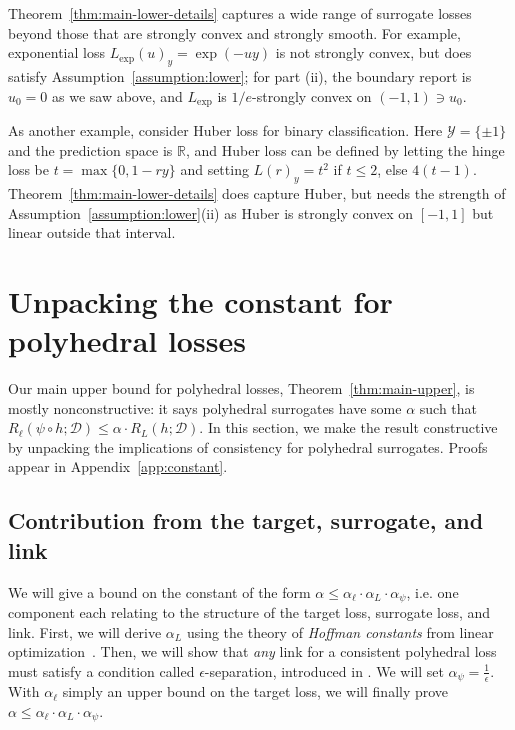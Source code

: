 \documentclass{article}
\theoremstyle{definition}\newtheorem{definition}{Definition}
\theoremstyle{definition}\newtheorem{assumption}{Assumption}
\newcommand{\reals}{\mathbb{R}}
\newcommand{\D}{\mathcal{D}}
\newcommand{\Y}{\mathcal{Y}}
\newcommand{\exploss}{L_{\mathrm{exp}}}
\begin{document}
Theorem~\ref{thm:main-lower-details} captures a wide range of surrogate losses beyond those that are strongly convex and strongly smooth.
For example, exponential loss $\exploss(u)_y = \exp(-uy)$ is not strongly convex, but does satisfy Assumption~\ref{assumption:lower}; for part (ii), the boundary report is $u_0 = 0$ as we saw above, and $\exploss$ is $1/e$-strongly convex on $(-1,1) \ni u_0$.

As another example, consider Huber loss for binary classification.
Here $\Y = \{\pm 1\}$ and the prediction space is $\reals$, and Huber loss can be defined by letting the hinge loss be $t = \max\{0, 1-ry\}$ and setting $L(r)_y = t^2$ if $t \leq 2$, else $4(t-1)$.
Theorem~\ref{thm:main-lower-details} does capture Huber, but needs the strength of Assumption~\ref{assumption:lower}(ii) as Huber is strongly convex on $[-1,1]$ but linear outside that interval. 

\section{Unpacking the constant for polyhedral losses} \label{sec:constant}

Our main upper bound for polyhedral losses, Theorem~\ref{thm:main-upper}, is mostly nonconstructive: it says polyhedral surrogates have some $\alpha$ such that $R_{\ell}(\psi \circ h; \D) \leq \alpha \cdot R_L(h;\D)$.
In this section, we make the result constructive by unpacking the implications of consistency for polyhedral surrogates.
Proofs appear in Appendix~\ref{app:constant}.

\subsection{Contribution from the target, surrogate, and link}

We will give a bound on the constant of the form $\alpha \leq \alpha_{\ell} \cdot \alpha_L \cdot \alpha_{\psi}$, i.e. one component each relating to the structure of the target loss, surrogate loss, and link.
First, we will derive $\alpha_L$ using the theory of \emph{Hoffman constants} from linear optimization~\cite{hoffman1952approximate}.
Then, we will show that \emph{any} link for a consistent polyhedral loss must satisfy a condition called $\epsilon$-separation, introduced in \cite{finocchiaro2019embedding}.
We will set $\alpha_{\psi} = \frac{1}{\epsilon}$.
With $\alpha_{\ell}$ simply an upper bound on the target loss, we will finally prove $\alpha \leq \alpha_{\ell} \cdot \alpha_L \cdot \alpha_{\psi}$.
\end{document}
